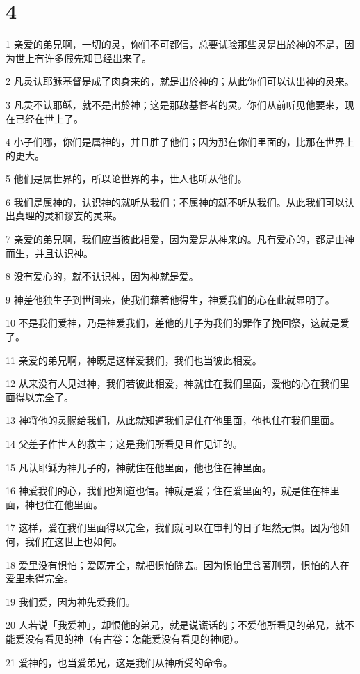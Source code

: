 \chapter{4}

\par 1 亲爱的弟兄啊，一切的灵，你们不可都信，总要试验那些灵是出於神的不是，因为世上有许多假先知已经出来了。
\par 2 凡灵认耶稣基督是成了肉身来的，就是出於神的；从此你们可以认出神的灵来。
\par 3 凡灵不认耶稣，就不是出於神；这是那敌基督者的灵。你们从前听见他要来，现在已经在世上了。
\par 4 小子们哪，你们是属神的，并且胜了他们；因为那在你们里面的，比那在世界上的更大。
\par 5 他们是属世界的，所以论世界的事，世人也听从他们。
\par 6 我们是属神的，认识神的就听从我们；不属神的就不听从我们。从此我们可以认出真理的灵和谬妄的灵来。
\par 7 亲爱的弟兄啊，我们应当彼此相爱，因为爱是从神来的。凡有爱心的，都是由神而生，并且认识神。
\par 8 没有爱心的，就不认识神，因为神就是爱。
\par 9 神差他独生子到世间来，使我们藉著他得生，神爱我们的心在此就显明了。
\par 10 不是我们爱神，乃是神爱我们，差他的儿子为我们的罪作了挽回祭，这就是爱了。
\par 11 亲爱的弟兄啊，神既是这样爱我们，我们也当彼此相爱。
\par 12 从来没有人见过神，我们若彼此相爱，神就住在我们里面，爱他的心在我们里面得以完全了。
\par 13 神将他的灵赐给我们，从此就知道我们是住在他里面，他也住在我们里面。
\par 14 父差子作世人的救主；这是我们所看见且作见证的。
\par 15 凡认耶稣为神儿子的，神就住在他里面，他也住在神里面。
\par 16 神爱我们的心，我们也知道也信。神就是爱；住在爱里面的，就是住在神里面，神也住在他里面。
\par 17 这样，爱在我们里面得以完全，我们就可以在审判的日子坦然无惧。因为他如何，我们在这世上也如何。
\par 18 爱里没有惧怕；爱既完全，就把惧怕除去。因为惧怕里含著刑罚，惧怕的人在爱里未得完全。
\par 19 我们爱，因为神先爱我们。
\par 20 人若说「我爱神」，却恨他的弟兄，就是说谎话的；不爱他所看见的弟兄，就不能爱没有看见的神（有古卷：怎能爱没有看见的神呢）。
\par 21 爱神的，也当爱弟兄，这是我们从神所受的命令。

